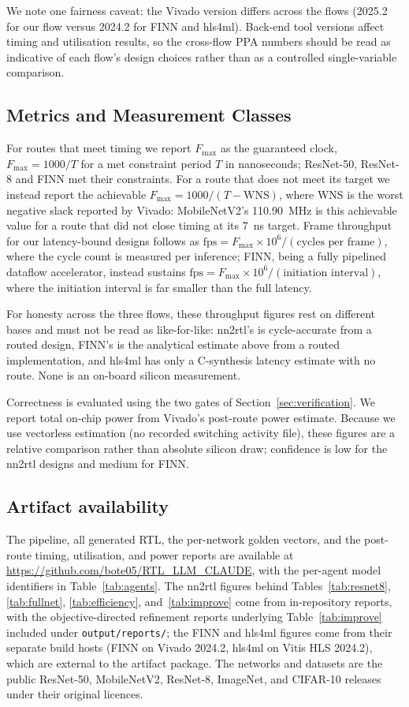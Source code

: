 \documentclass[acmtog,authorversion]{acmart}
\begin{document}
We note one fairness caveat: the Vivado version differs across the flows (2025.2 for our flow versus 2024.2 for FINN and hls4ml). Back-end tool versions affect timing and utilisation results, so the cross-flow PPA numbers should be read as indicative of each flow's design choices rather than as a controlled single-variable comparison.

\subsection{Metrics and Measurement Classes}\label{sec:metrics}

For routes that meet timing we report $F_{\max}$ as the guaranteed clock, $F_{\max} = 1000 / T$ for a met constraint period $T$ in nanoseconds; ResNet-50, ResNet-8 and FINN met their constraints. For a route that does not meet its target we instead report the achievable $F_{\max} = 1000 / (T - \text{WNS})$, where WNS is the worst negative slack reported by Vivado: MobileNetV2's 110.90~MHz is this achievable value for a route that did not close timing at its 7~ns target. Frame throughput for our latency-bound designs follows as $\text{fps} = F_{\max} \times 10^{6} / (\text{cycles per frame})$, where the cycle count is measured per inference; FINN, being a fully pipelined dataflow accelerator, instead sustains $\text{fps} = F_{\max} \times 10^{6} / (\text{initiation interval})$, where the initiation interval is far smaller than the full latency.

For honesty across the three flows, these throughput figures rest on different bases and must not be read as like-for-like: nn2rtl's is cycle-accurate from a routed design, FINN's is the analytical estimate above from a routed implementation, and hls4ml has only a C-synthesis latency estimate with no route. None is an on-board silicon measurement.

Correctness is evaluated using the two gates of Section~\ref{sec:verification}. We report total on-chip power from Vivado's post-route power estimate. Because we use vectorless estimation (no recorded switching activity file), these figures are a relative comparison rather than absolute silicon draw; confidence is low for the nn2rtl designs and medium for FINN.

\subsection{Artifact availability}
The pipeline, all generated RTL, the per-network golden vectors, and the post-route timing, utilisation, and power reports are available at \url{https://github.com/bote05/RTL_LLM_CLAUDE}, with the per-agent model identifiers in Table~\ref{tab:agents}. The nn2rtl figures behind Tables~\ref{tab:resnet8}, \ref{tab:fullnet}, \ref{tab:efficiency}, and~\ref{tab:improve} come from in-repository reports, with the objective-directed refinement reports underlying Table~\ref{tab:improve} included under \texttt{output/reports/}; the FINN and hls4ml figures come from their separate build hosts (FINN on Vivado 2024.2, hls4ml on Vitis HLS 2024.2), which are external to the artifact package. The networks and datasets are the public ResNet-50, MobileNetV2, ResNet-8, ImageNet, and CIFAR-10 releases under their original licences.
\end{document}
